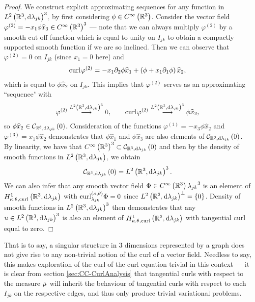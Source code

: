 \begin{proof}
	We construct explicit approximating sequences for any function in $L^{2}\left( \mathbb{R}^3,\mathrm{d} \lambda_{jk} \right)^3$, by first considering $\phi\in C^{\infty}\left( \mathbb{R}^3 \right)$.
	Consider the vector field $\varphi^{(2)} = -x_1\phi\widehat{x}_3\in C^{\infty}\left( \mathbb{R}^3 \right)^3$ --- note that we can always multiply $\varphi^{(2)}$ by a smooth cut-off function which is equal to unity on $I_{jk}$ to obtain a compactly supported smooth function if we are so inclined.
	Then we can observe that $\varphi^{(2)}=0$ on $I_{jk}$ (since $x_1=0$ here) and 
	\begin{align*}
		\mathrm{curl}_{}\varphi^{(2)} = -x_1\partial_2\phi\widehat{x}_1 + \left( \phi + x_1\partial_1\phi \right)\widehat{x}_2,
	\end{align*}
	which is equal to $\phi\widehat{x}_2$ on $I_{jk}$.
	This implies that $\varphi^{(2)}$ serves as an approximating ``sequence" with
	\begin{align*}
		\varphi^{(2)} \overset{L^{2}\left( \mathbb{R}^3,\mathrm{d} \lambda_{jk} \right)^3}{\longrightarrow} 0, 
		\qquad
		\mathrm{curl}_{}\varphi^{(2)} \overset{L^{2}\left( \mathbb{R}^3,\mathrm{d} \lambda_{jk} \right)^3}{\longrightarrow} \phi\widehat{x}_2,
	\end{align*}
	so $\phi\widehat{x}_2\in\mathcal{C}_{ \mathbb{R}^3, \mathrm{d}\lambda_{jk}}\left( 0 \right)$.
	Consideration of the functions $\varphi^{(1)} = -x_3\phi\widehat{x}_2$ and $\varphi^{(3)}=x_1\phi\widehat{x}_2$ demonstrates that $\phi\widehat{x}_1$ and $\phi\widehat{x}_3$ are also elements of $\mathcal{C}_{ \mathbb{R}^3, \mathrm{d}\lambda_{jk}}\left( 0 \right)$.
	By linearity, we have that $C^{\infty}\left( \mathbb{R}^3 \right)^3\subset\mathcal{C}_{ \mathbb{R}^3, \mathrm{d}\lambda_{jk}}\left( 0 \right)$ and then by the density of smooth functions in $L^{2}\left( \mathbb{R}^3,\mathrm{d} \lambda_{jk} \right)$, we obtain
	\begin{align*}
		\mathcal{C}_{ \mathbb{R}^3, \mathrm{d}\lambda_{jk}}\left( 0 \right) = L^{2}\left( \mathbb{R}^3,\mathrm{d} \lambda_{jk} \right)^3.
	\end{align*}
	We can also infer that any smooth vector field $\Phi\in C^{\infty}\left( \mathbb{R}^3 \right){\lambda_{jk}}^3$ is an element of $H^1_{\kappa,\theta,\mathrm{curl}}\left( \mathbb{R}^3, \mathrm{d}\lambda_{jk} \right)$ with $\mathrm{curl}_{\lambda_{jk}}^{\left( \kappa, \theta \right)}\Phi = 0$ since $L^{2}\left( \mathbb{R}^3,\mathrm{d} \lambda_{jk} \right)^{\perp} = \left\{ 0 \right\}$.
	Density of smooth functions in $L^{2}\left( \mathbb{R}^3,\mathrm{d} \lambda_{jk} \right)^3$ then demonstrates that any $u\in L^{2}\left( \mathbb{R}^3,\mathrm{d} \lambda_{jk} \right)^3$ is also an element of $H^1_{\kappa,\theta,\mathrm{curl}}\left( \mathbb{R}^3, \mathrm{d}\lambda_{jk} \right)$ with tangential curl equal to zero.
\end{proof}
That is to say, a singular structure in 3 dimensions represented by a graph does not give rise to any non-trivial notion of the curl of a vector field.
Needless to say, this makes exploration of the curl of the curl equation trivial in this context --- it is clear from section \ref{sec:CC-CurlAnalysis} that tangential curls with respect to the measure $\mu$ will inherit the behaviour of tangential curls with respect to each $I_{jk}$ on the respective edges, and thus only produce trivial variational problems.

